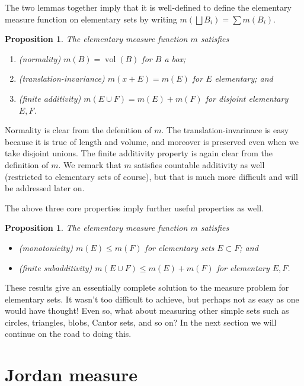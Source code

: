 \documentclass[11pt,oneside]{amsbook}
\DeclareMathOperator{\vol}{vol}
\theoremstyle{definition}
\theoremstyle{plain}
\newtheorem{prop}[thm]{Proposition}
\theoremstyle{definition}
\theoremstyle{remark}
\numberwithin{equation}{section}
\numberwithin{figure}{section}
\begin{document}
The two lemmas together imply that it is well-defined to define the elementary measure function on elementary sets by writing $m(\bigsqcup B_i)=\sum m(B_i)$.

\begin{prop}
  The elementary measure function $m$ satisfies
  \begin{enumerate}
  \item (normality) $m(B)=\vol(B)$ for $B$ a box;
  \item (translation-invariance) $m(x+E)=m(E)$ for $E$ elementary; and
  \item (finite additivity) $m(E\cup F)=m(E)+m(F)$ for disjoint elementary $E,F$.
  \end{enumerate}
\end{prop}

Normality is clear from the defenition of $m$. The translation-invarinace is easy because it is true of length and volume, and moreover is preserved even when we take disjoint unions. The finite additivity property is again clear from the definition of $m$. We remark that $m$ satisfies countable additivity as well (restricted to elementary sets of course), but that is much more difficult and will be addressed later on.

The above three core properties imply further useful properties as well.

\begin{prop}
  The elementary measure function $m$ satisfies
  \begin{itemize}
  \item (monotonicity) $m(E)\leq m(F)$ for elementary sets $E\subset F$; and
  \item (finite subadditivity) $m(E\cup F)\leq m(E)+m(F)$ for elementary $E,F$.
  \end{itemize}
\end{prop}

These results give an essentially complete solution to the measure problem for elementary sets. It wasn't too difficult to achieve, but perhaps not as easy as one would have thought! Even so, what about measuring other simple sets such as circles, triangles, blobs, Cantor sets, and so on? In the next section we will continue on the road to doing this.

\newpage
\section{Jordan measure}
\end{document}
